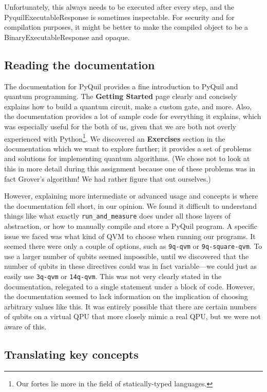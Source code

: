 \documentclass[12pt]{article}
\begin{document}
Unfortunately, this always needs to be executed after every step, and the PyquilExecutableResponse is sometimes inspectable.
For security and for compilation purposes, it might be better to make the compiled object to be a BinaryExecutableResponse and opaque.

\subsection{Reading the documentation}

The documentation for PyQuil provides a fine introduction to PyQuil and quantum programming.
The \textbf{Getting Started} page clearly and concisely explains how to build a quantum circuit, make a custom gate, and more.
Also, the documentation provides a lot of sample code for everything it explains, which was especially useful for the both of us, given that we are both not overly experienced with Python\footnote{Our fortes lie more in the field of statically-typed languages.}.
We discovered an \textbf{Exercises} section in the documentation which we want to explore further; it provides a set of problems and solutions for implementing quantum algorithms. (We chose not to look at this in more detail during this assignment because one of these problems was in fact Grover's algorithm! We had rather figure that out ourselves.)

However, explaining more intermediate or advanced usage and concepts is where the documentation fell short, in our opinion.
We found it difficult to understand things like what exactly \texttt{run\_and\_measure} does under all those layers of abstraction, or how to manually compile and store a PyQuil program.
A specific issue we faced was what kind of QVM to choose when running our programs.
It seemed there were only a couple of options, such as \texttt{9q-qvm} or \texttt{9q-square-qvm}.
To use a larger number of qubits seemed impossible, until we discovered that the number of qubits in these directives could was in fact variable---we could just as easily use \texttt{3q-qvm} or \texttt{14q-qvm}.
This was not very clearly stated in the documentation, relegated to a single statement under a block of code.
However, the documentation seemed to lack information on the implication of choosing arbitrary values like this.
It was entirely possible that there are certain numbers of qubits on a virtual QPU that more closely mimic a real QPU, but we were not aware of this.

\subsection{Translating key concepts}
\end{document}
